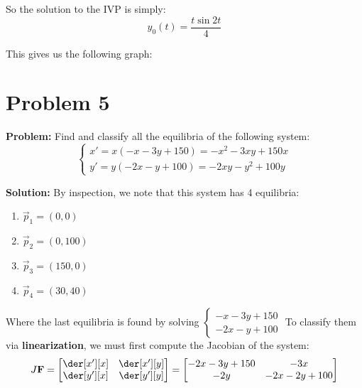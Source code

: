 \documentclass{article}
\begin{document}
So the solution to the IVP is simply:
\begin{equation*}
  y_0(t)=\frac{t\sin2t}{4}
\end{equation*}

This gives us the following graph:
\begin{center}
\end{center}

\section*{Problem 5}
\noindent\textbf{Problem:} Find and classify all the equilibria of the following system:
$$\begin{cases}
  x'=x(-x-3y+150)=-x^2-3xy+150x\\
  y'=y(-2x-y+100)=-2xy-y^2+100y
\end{cases}$$

\noindent\textbf{Solution:} By inspection, we note that this system has 4 equilibria:
\begin{enumerate}[label=\alph*)]
  \item $\vec p_1=(0,0)$
  \item $\vec p_2=(0,100)$
  \item $\vec p_3=(150,0)$
  \item $\vec p_4=(30,40)$
\end{enumerate}

Where the last equilibria is found by solving $\begin{cases}
  -x-3y+150\\
  -2x-y+100
\end{cases}$ To classify them via \textbf{linearization}, we must first compute the Jacobian of the system:
\begin{equation*}
  J\vec F=\begin{bmatrix}
    \der[x'][x] & \der[x'][y]\\
    \der[y'][x] & \der[y'][y]
  \end{bmatrix}=\begin{bmatrix}
    -2x-3y+150 & -3x\\
    -2y & -2x-2y+100
  \end{bmatrix}
\end{equation*}
\end{document}
